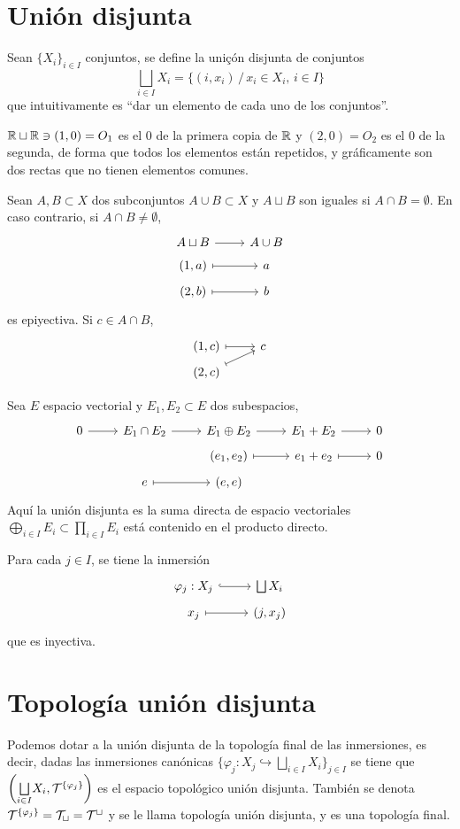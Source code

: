 \section{Uni\'on disjunta}
Sean $\{X_i\}_{i\in I}$ conjuntos, se define la uniçón disjunta de conjuntos
$$\bigsqcup_{i \in I} X_i= \{(i, x_i) \, / \, x_i \in X_i, \, i \in I\}$$
que intuitivamente es ``dar un elemento de cada uno de los conjuntos''.
\begin{ejem}
    $\mathbb{R} \sqcup \mathbb{R} \ni (1,0) = O_1$ es el 0 de la primera copia de $\mathbb{R}$ y $(2,0)=O_2$ es el 0 de la segunda, de forma que todos los elementos est\'an repetidos, y gr\'aficamente son dos rectas que no tienen elementos comunes. 
\end{ejem}
\begin{ejem}
    Sean $A, B\subset X$ dos subconjuntos $A\cup B \subset X$ y $A\sqcup B$ son iguales si $A\cap B = \emptyset$. En caso contrario, si $A\cap B \neq \emptyset$,
    $$\bt A\sqcup B \rar & A\cup B \\[-5mm] (1,a) \rarmaps & a \\[-5mm] (2,b) \rarmaps & b \et$$
    es epiyectiva. Si $c\in A\cap B$, 
    $$\bt (1,c) \rarmaps & c \\[-5mm] (2,c) \arrow[mapsto]{ru} & \et$$
\end{ejem}
\begin{ejem}
    Sea $E$ espacio vectorial y $E_1, E_2 \subset E$ dos subespacios,
    $$\bt 0 \rar & E_1 \cap E_2 \rar & E_1 \oplus E_2 \rar & E_1+E_2 \rar & 0 \\[-5mm]
    & & (e_1,e_2) \rarmaps & e_1 + e_2 \rarmaps & 0 \\[-5mm] & e \rarmaps & (e,e)
    \et$$
    Aqu\'i la uni\'on disjunta es la suma directa de espacio vectoriales $\bigoplus_{i \in I} E_i \subset \prod_{i \in I} E_i$ est\'a contenido en el producto directo. 
\end{ejem}
Para cada $j \in I$, se tiene la inmersi\'on
$$\bt \varphi_j : X_j \rar[hook] & \bigsqcup X_i \\[-5mm] x_j \rarmaps & (j, x_j) \et$$
que es inyectiva.

\section{Topolog\'ia uni\'on disjunta}

Podemos dotar a la uni\'on disjunta de la topolog\'ia final de las inmersiones, es decir, dadas las inmersiones can\'onicas $\big\{ \varphi_j : X_j \hookrightarrow \bigsqcup_{i \in I} X_i \big\}_{j\in I}$ se tiene que $  \left( \underset{i \in I}{\bigsqcup} X_i, \mathcal{T}^{\{\varphi_j\}}\right)$ es el espacio topol\'ogico uni\'on disjunta. Tambi\'en se denota $\mathcal{T}^{\{\varphi_j\}} = \mathcal{T}_{\sqcup} = \mathcal{T}^{\sqcup}$ y se le llama topolog\'ia uni\'on disjunta, y es una topolog\'ia final.

